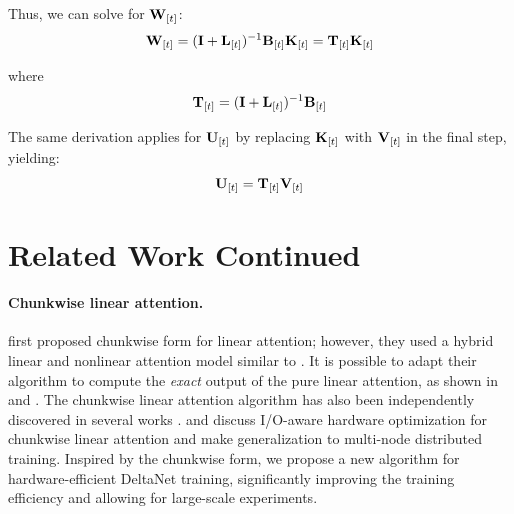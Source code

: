 Thus, we can solve for ${\mathbf{W}}_{[t]}$:
\begin{equation*}
    {\mathbf{W}}_{[t]} = ({\mathbf{I}} + {\mathbf{L}}_{[t]})^{-1}{\mathbf{B}}_{[t]}{\mathbf{K}}_{[t]} = {\mathbf{T}}_{[t]}{\mathbf{K}}_{[t]}
\end{equation*}

where
\begin{equation*}
    {\mathbf{T}}_{[t]} = ({\mathbf{I}} + {\mathbf{L}}_{[t]})^{-1}{\mathbf{B}}_{[t]}
\end{equation*}


The same derivation applies for ${\mathbf{U}}_{[t]}$ by replacing ${\mathbf{K}}_{[t]}$ with ${\mathbf{V}}_{[t]}$ in the final step, yielding:
\begin{equation}
    {\mathbf{U}}_{[t]} = {\mathbf{T}}_{[t]}{\mathbf{V}}_{[t]}
\end{equation}




\section{Related Work Continued}
\label{app:related}
\paragraph{Chunkwise linear attention.} \citet{hua_transformer_2022} first proposed chunkwise form for linear attention; however, they used a hybrid linear and nonlinear attention model similar to \citet{munkhdalai2024leave}.  It is possible to adapt their algorithm to compute the \emph{exact} output of the pure linear attention, as shown in \citet{sun2023retentive} and \citet{yang_gated_2023}. The chunkwise linear attention algorithm has also been independently discovered in several works \cite{sun2023retentive, polysketch, mamba2}.  \citet{yang_gated_2023} and \citet{lightning2} discuss I/O-aware hardware optimization for chunkwise linear attention and \citet{Sun2024LinearAS} make generalization to multi-node distributed training. Inspired by the chunkwise form, we propose a new algorithm for hardware-efficient DeltaNet training, significantly improving the training efficiency and allowing for large-scale experiments. 

